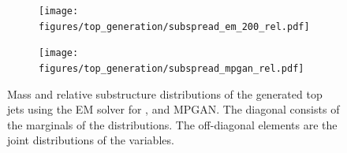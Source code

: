 \begin{figure}[hbpt]
    \begin{subfigure}{0.5\textwidth}
        \centering
        \texttt{[image: figures/top\_generation/subspread\_em\_200\_rel.pdf]}
    \end{subfigure}%
    \begin{subfigure}{0.5\textwidth}
        \centering
        \texttt{[image: figures/top\_generation/subspread\_mpgan\_rel.pdf]}
    \end{subfigure}%
    \caption{Mass and relative substructure distributions of the generated top jets using the EM solver for \pcjedi, and MPGAN. The diagonal consists of the marginals of the distributions. The off-diagonal elements are the joint distributions of the variables.}
    \label{fig:top_correlations}
\end{figure}











